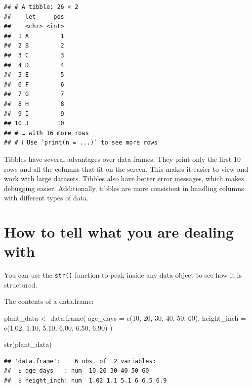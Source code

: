 \documentclass[
]{book}
\newenvironment{Shaded}{\begin{snugshade}}{\end{snugshade}}
\newcommand{\AttributeTok}[1]{\textcolor[rgb]{0.77,0.63,0.00}{#1}}
\newcommand{\DecValTok}[1]{\textcolor[rgb]{0.00,0.00,0.81}{#1}}
\newcommand{\FloatTok}[1]{\textcolor[rgb]{0.00,0.00,0.81}{#1}}
\newcommand{\FunctionTok}[1]{\textcolor[rgb]{0.00,0.00,0.00}{#1}}
\newcommand{\NormalTok}[1]{#1}
\newcommand{\OtherTok}[1]{\textcolor[rgb]{0.56,0.35,0.01}{#1}}
\begin{document}
\begin{verbatim}
## # A tibble: 26 × 2
##    let     pos
##    <chr> <int>
##  1 A         1
##  2 B         2
##  3 C         3
##  4 D         4
##  5 E         5
##  6 F         6
##  7 G         7
##  8 H         8
##  9 I         9
## 10 J        10
## # … with 16 more rows
## # ℹ Use `print(n = ...)` to see more rows
\end{verbatim}

Tibbles have several advantages over data frames. They print only the first 10 rows and all the columns that fit on the screen. This makes it easier to view and work with large datasets. Tibbles also have better error messages, which makes debugging easier. Additionally, tibbles are more consistent in handling columns with different types of data.

\hypertarget{how-to-tell-what-you-are-dealing-with}{%
\section*{How to tell what you are dealing with}\label{how-to-tell-what-you-are-dealing-with}}

You can use the \texttt{str()} function to peak inside any data object to see how it is structured.

The contents of a data.frame:

\begin{Shaded}
\begin{Highlighting}[]
\NormalTok{plant\_data }\OtherTok{\textless{}{-}} \FunctionTok{data.frame}\NormalTok{(}
  \AttributeTok{age\_days =} \FunctionTok{c}\NormalTok{(}\DecValTok{10}\NormalTok{, }\DecValTok{20}\NormalTok{, }\DecValTok{30}\NormalTok{, }\DecValTok{40}\NormalTok{, }\DecValTok{50}\NormalTok{, }\DecValTok{60}\NormalTok{),}
  \AttributeTok{height\_inch =} \FunctionTok{c}\NormalTok{(}\FloatTok{1.02}\NormalTok{, }\FloatTok{1.10}\NormalTok{, }\FloatTok{5.10}\NormalTok{, }\FloatTok{6.00}\NormalTok{, }\FloatTok{6.50}\NormalTok{, }\FloatTok{6.90}\NormalTok{)}
\NormalTok{)}

\FunctionTok{str}\NormalTok{(plant\_data)}
\end{Highlighting}
\end{Shaded}

\begin{verbatim}
## 'data.frame':    6 obs. of  2 variables:
##  $ age_days   : num  10 20 30 40 50 60
##  $ height_inch: num  1.02 1.1 5.1 6 6.5 6.9
\end{verbatim}
\end{document}
